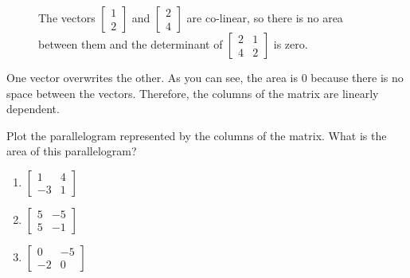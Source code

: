 \begin{figure}[H]
    \centering
    \caption{The vectors $\begin{bmatrix} 1\\2 \end{bmatrix}$ and 
    $\begin{bmatrix} 2\\4 \end{bmatrix}$ are co-linear, so there is no area 
    between them and the determinant of $\begin{bmatrix} 2 & 1\\ 4 & 2 
    \end{bmatrix}$ is zero.}
    \label{fig:zero_det}
\end{figure}

One vector overwrites the other. As you can see, the area is 0 because there 
is no space between the vectors. Therefore, the columns of the matrix are 
linearly dependent.

\begin{Exercise}[title = {Finding the Determinant}, label = geo_det]
Plot the parallelogram represented by the columns of the matrix. What is the 
area of this parallelogram?
\begin{enumerate}
\item $\begin{bmatrix}
1 &4\\
-3 & 1
\end{bmatrix}$
\item $\begin{bmatrix}
5 & -5 \\
5 & -1
\end{bmatrix}$
\item $\begin{bmatrix}
0 & -5 \\
-2 & 0 
\end{bmatrix}$
\end{enumerate}
\end{Exercise}

